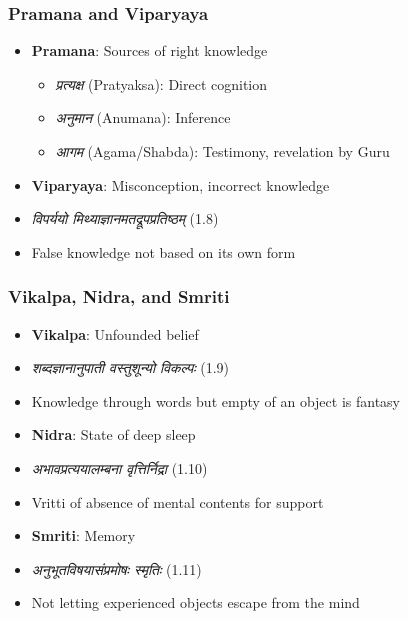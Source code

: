 \begin{frame}[fragile]\frametitle{Pramana and Viparyaya}
    \begin{itemize}
        \item \textbf{Pramana}: Sources of right knowledge
        \begin{itemize}
            \item \textit{प्रत्यक्ष} (Pratyaksa): Direct cognition
            \item \textit{अनुमान} (Anumana): Inference
            \item \textit{आगम} (Agama/Shabda): Testimony, revelation by Guru
        \end{itemize}
        \item \textbf{Viparyaya}: Misconception, incorrect knowledge
        \item \textit{विपर्ययो मिथ्याज्ञानमतद्रूपप्रतिष्ठम्} (1.8)
        \item False knowledge not based on its own form
    \end{itemize}
\end{frame}

\begin{frame}[fragile]\frametitle{Vikalpa, Nidra, and Smriti}
    \begin{itemize}
        \item \textbf{Vikalpa}: Unfounded belief
        \item \textit{शब्दज्ञानानुपाती वस्तुशून्यो विकल्पः} (1.9)
        \item Knowledge through words but empty of an object is fantasy
        \item \textbf{Nidra}: State of deep sleep
        \item \textit{अभावप्रत्ययालम्बना वृत्तिर्निद्रा} (1.10)
        \item Vritti of absence of mental contents for support
        \item \textbf{Smriti}: Memory
        \item \textit{अनुभूतविषयासंप्रमोषः स्मृतिः} (1.11)
        \item Not letting experienced objects escape from the mind
    \end{itemize}
\end{frame}

